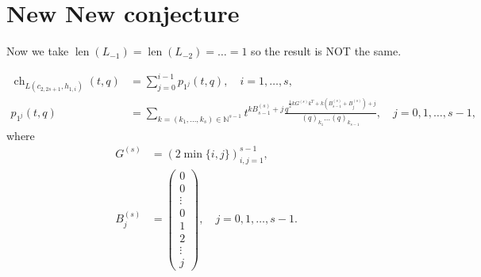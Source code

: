 \documentclass[a4paper, 12pt, reqno]{amsart}
\DeclareMathOperator{\ch}{ch}
\DeclareMathOperator{\len}{len}
\begin{document}
\section{New New conjecture}
\label{sec:new-new-conjecture}

Now we take $\len(L_{-1}) = \len(L_{-2}) = \dots = 1$ so the result is NOT the same.

\begin{align*}
  \ch_{L(c_{2, 2s + 1}, h_{1, i})}(t, q) &= \sum_{j = 0}^{i - 1}p_{1^j}(t, q), \quad i = 1, \dots, s, \\
  p_{1^j}(t, q) &= \sum_{k = (k_1, \dots, k_s) \in \mathbb{N}^{s - 1}}t^{kB^{(s)}_{s - 1} + j}\frac{q^{\frac{1}{2}kG^{(s)}k^T + k(B^{(s)}_{s - 1} + B^{(s)}_j) + j}}{(q)_{k_1}\dots(q)_{k_{s - 1}}}, \quad j = 0, 1, \dots, s - 1,
\end{align*}
where
\begin{align*}
  G^{(s)} &= (2\min\{i, j\})_{i, j = 1}^{s - 1}, \\
  B^{(s)}_j &=
              \left(\begin{smallmatrix}
                      0 \\
                      0 \\
                      \vdots \\
                      0 \\
                      1 \\
                      2 \\
                      \vdots \\
                      j
                    \end{smallmatrix}\right), \quad j = 0, 1, \dots, s - 1.  
\end{align*}
\end{document}
